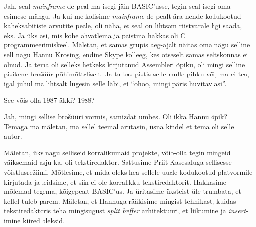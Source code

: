 
Jah, seal \emph{mainframe}-de peal ma isegi jäin BASIC'usse, tegin seal isegi 
oma esimese mängu. Ja kui me kolisime  \emph{mainframe}-de pealt ära nende 
kodukootud kaheksabitiste arvutite peale, oli näha, et seal on lihtsam  
riistvarale ligi saada, eks. Ja üks asi, mis kohe ahvatlema ja paistma hakkas 
oli C programmeerimiskeel.  Mäletan, et samas grupis aeg-ajalt 
näitas oma nägu selline sell nagu Hannu Krosing, 
endine Skype kolleeg, kes  otseselt samas seltskonnas ei olnud. Ja tema oli 
selleks hetkeks  kirjutanud Assembleri õpiku, oli mingi selline pisikene 
brošüür põhimõtteliselt.  Ja ta kas pistis selle mulle pihku või, ma ei tea, 
igal juhul ma lihtsalt lugesin selle läbi, et \enquote{ohoo, mingi päris 
huvitav asi}. 


See võis olla 1987 äkki? 1988?


Jah, mingi sellise brošüüri vormis, 
samizdat umbes. 
Oli ikka Hannu õpik? Temaga ma mäletan, ma sellel teemal arutasin,  üsna kindel 
et tema oli selle autor.


Mäletan, üks nagu selliseid korralikumaid projekte, võib-olla tegin mingeid 
väiksemaid asju ka, oli tekstiredaktor\label{sisu!jaani_tekstiredaktor}. 
Sattusime Priit Kasesaluga sellisesse 
võistlusrežiimi. Mõtlesime, et mida oleks hea sellele uuele kodukootud 
platvormile kirjutada ja leidsime, et siin ei ole korralikku tekstiredaktorit. 
Hakkasime mõlemad tegema, kõigepealt BASIC'us. Ja üritasime 
üksteist üle trumbata, et kellel tuleb parem. Mäletan, et 
Hannuga rääkisime  mingist tehnikast, kuidas 
tekstiredaktoris teha  mingisugust \emph{split buffer} arhitektuuri, et 
liikumine ja \emph{insert}-imine kiired oleksid.

